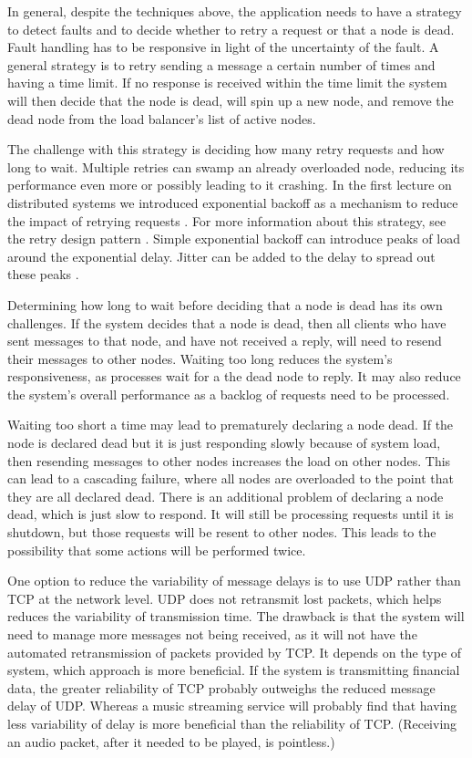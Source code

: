 In general, despite the techniques above, the application needs to have a strategy to detect faults
and to decide whether to retry a request or that a node is dead.
Fault handling has to be responsive in light of the uncertainty of the fault.
A general strategy is to retry sending a message a certain number of times and having a time limit.
If no response is received within the time limit the system will then decide that the node is dead,
will spin up a new node, and remove the dead node from the load balancer's list of active nodes.

The challenge with this strategy is deciding how many retry requests and how long to wait.
Multiple retries can swamp an already overloaded node, reducing its performance even more or possibly leading to it crashing.
In the first lecture on distributed systems we introduced exponential backoff as a mechanism to reduce the impact of retrying requests \cite{distributed1-slides}.
For more information about this strategy, see the retry design pattern \cite{retry-pattern}.
Simple exponential backoff can introduce peaks of load around the exponential delay.
Jitter can be added to the delay to spread out these peaks \cite{backoff-jitter}.

Determining how long to wait before deciding that a node is dead has its own challenges.
If the system decides that a node is dead,
then all clients who have sent messages to that node, and have not received a reply, will need to resend their messages to other nodes.
Waiting too long reduces the system's responsiveness, as processes wait for a the dead node to reply.
It may also reduce the system's overall performance as a backlog of requests need to be processed.

Waiting too short a time may lead to prematurely declaring a node dead.
If the node is declared dead but it is just responding slowly because of system load,
then resending messages to other nodes increases the load on other nodes.
This can lead to a cascading failure, where all nodes are overloaded to the point that they are all declared dead.
There is an additional problem of declaring a node dead, which is just slow to respond.
It will still be processing requests until it is shutdown, but those requests will be resent to other nodes.
This leads to the possibility that some actions will be performed twice.

One option to reduce the variability of message delays is to use UDP rather than TCP at the network level.
UDP does not retransmit lost packets, which helps reduces the variability of transmission time.
The drawback is that the system will need to manage more messages not being received,
as it will not have the automated retransmission of packets provided by TCP.
It depends on the type of system, which approach is more beneficial.
If the system is transmitting financial data, the greater reliability of TCP probably outweighs the reduced message delay of UDP.
Whereas a music streaming service will probably find that having less variability of delay is more beneficial than the reliability of TCP.
(Receiving an audio packet, after it needed to be played, is pointless.)

